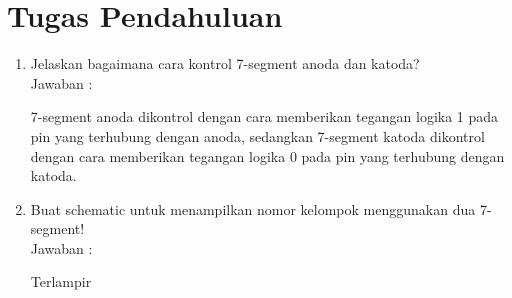 \section*{Tugas Pendahuluan}
\begin{enumerate}
  \item Jelaskan bagaimana cara kontrol 7-segment anoda dan katoda? \\
  Jawaban : 
  
  7-segment anoda dikontrol dengan cara memberikan tegangan logika 1 pada pin yang terhubung dengan anoda, sedangkan 7-segment katoda dikontrol dengan cara memberikan tegangan logika 0 pada pin yang terhubung dengan katoda.

  \item Buat schematic untuk menampilkan nomor kelompok menggunakan dua 7-segment! \\
  Jawaban : 
  
  Terlampir

\end{enumerate}

\newpage